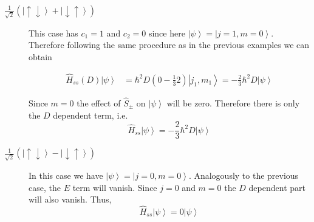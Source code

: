 \documentclass[A4paper, 12pt]{article}
\newcommand{\du}{\left | \downarrow\uparrow \right \rangle}
\newcommand{\ud}{\left | \uparrow\downarrow \right \rangle}
\newcommand{\mone}{\frac{1}{\sqrt{2}}\left( \ud + \du\right)}
\newcommand{\mmone}{\frac{1}{\sqrt{2}}\left( \ud - \du\right)}
\begin{document}
\begin{description}
\item[$\mone$] This case has $ c_{1}=1 $ and $ c_{2}=0 $ since here $ \left |
\psi  \right \rangle = \left | j=1, m=0 \right \rangle  $. Therefore following
the same procedure as in the previous examples we can obtain

\begin{align}
  \label{eq:D_part_spin_spin_general_calculation}
  \hat{H}_{ss}(D)
\left | \psi  \right \rangle &=
  \hbar^{2}D
  \left(0- \frac{1}{3} 2\right)
\left | j_{1}, m_{1} \right \rangle
=
- \frac{2}{3}
\hbar^{2}D
\left | \psi  \right \rangle
\end{align}

Since $ m=0 $ the effect of $ \hat{S}_{\pm} $ on $ \left | \psi  \right \rangle  $ will be zero. Therefore there is only the $ D $ dependent term, i.e.
\begin{equation}
  \label{eq:z-vector-eigenvalue-equation}
  \hat{H}_{ss}
\left | \psi  \right \rangle
=
- \frac{2}{3}
\hbar^{2}D
\left | \psi  \right \rangle
  \end{equation}


\item[$\mmone$]
  In this case we have $ \left | \psi  \right \rangle = \left | j=0, m=0 \right \rangle  $. Analogously to the previous case, the $ E $ term will vanish. Since $ j=0 $ and $ m=0 $ the $ D $ dependent part will also vanish. Thus,
  \begin{equation}
    \label{eq:z-vector-eigenvalue-equation}
    \hat{H}_{ss}
  \left | \psi  \right \rangle
  =
  0
\left | \psi  \right \rangle
  \end{equation}
\end{description}
\end{document}
